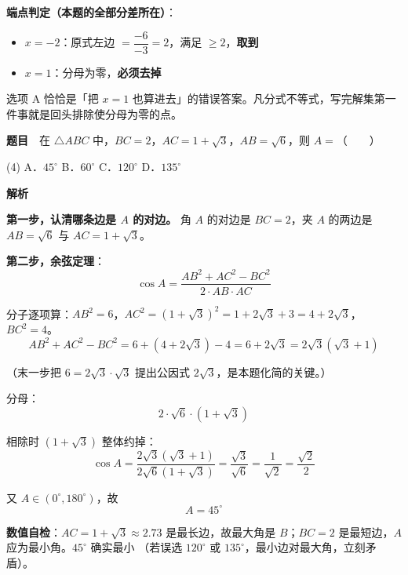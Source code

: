 
\begin{gktip}
\textbf{端点判定（本题的全部分差所在）}：
\begin{itemize}
\item $x=-2$：原式左边 $=\dfrac{-6}{-3}=2$，满足 $\ge2$，\textbf{取到} 
\item $x=1$：分母为零，\textbf{必须去掉} 
\end{itemize}

选项 A 恰恰是「把 $x=1$ 也算进去」的错误答案。凡分式不等式，写完解集第一件事就是回头排除使分母为零的点。
\end{gktip}

\par\medskip


\textbf{题目}　在 $\triangle ABC$ 中，$BC=2$，$AC=1+\sqrt3$，$AB=\sqrt6$，则 $A=$（　　）

\begin{gkopts}(4)
\task A．$45^\circ$
\task B．$60^\circ$
\task C．$120^\circ$
\task D．$135^\circ$
\end{gkopts}

\textbf{解析}

\textbf{第一步，认清哪条边是 $A$ 的对边。} 角 $A$ 的对边是 $BC=2$，夹 $A$ 的两边是 $AB=\sqrt6$ 与 $AC=1+\sqrt3$。

\textbf{第二步，余弦定理}：
\[\cos A=\frac{AB^2+AC^2-BC^2}{2\cdot AB\cdot AC}\]

分子逐项算：$AB^2=6$，$AC^2=\left(1+\sqrt3\right)^2=1+2\sqrt3+3=4+2\sqrt3$，$BC^2=4$。
\[AB^2+AC^2-BC^2=6+\left(4+2\sqrt3\right)-4=6+2\sqrt3=2\sqrt3\left(\sqrt3+1\right)\]

（末一步把 $6=2\sqrt3\cdot\sqrt3$ 提出公因式 $2\sqrt3$，是本题化简的关键。）

分母：
\[2\cdot\sqrt6\cdot\left(1+\sqrt3\right)\]

相除时 $\left(1+\sqrt3\right)$ 整体约掉：
\[\cos A=\frac{2\sqrt3\left(\sqrt3+1\right)}{2\sqrt6\left(1+\sqrt3\right)}=\frac{\sqrt3}{\sqrt6}=\frac1{\sqrt2}=\frac{\sqrt2}{2}\]

又 $A\in(0^\circ,180^\circ)$，故
\[A=45^\circ\]


\begin{gktip}
\textbf{数值自检}：$AC=1+\sqrt3\approx2.73$ 是最长边，故最大角是 $B$；$BC=2$ 是最短边，$A$ 应为最小角。$45^\circ$ 确实最小 （若误选 $120^\circ$ 或 $135^\circ$，最小边对最大角，立刻矛盾）。
\end{gktip}

